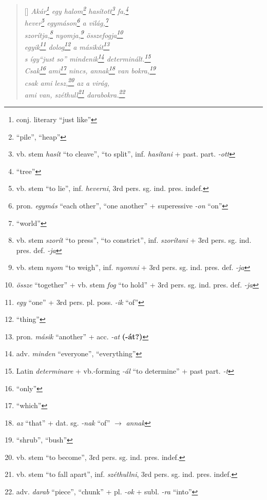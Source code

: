\documentclass[a4paper,12pt,twoside,final]{book}
\begin{document}
\begin{verse}[\versewidth]
  \it
  Akár\footnote{conj. literary ``just like''} egy
  halom\footnote{``pile'', ``heap''} hasított\footnote{vb. stem
  \emph{hasít} ``to cleave'', ``to split'', inf. \emph{hasítani} +
  past. part. \emph{-ott} } fa,\footnote{``tree''} \\
  hever\footnote{vb. stem ``to lie'', inf. \emph{heverni}, 3rd
    pers. sg. ind. pres. indef.} egymáson\footnote{pron. \emph{egymás}
  ``each other'', ``one another'' + superessive \emph{-on} ``on''} a
  világ,\footnote{``world''} \\
  szorítja,\footnote{vb. stem \emph{szorít} ``to press'', ``to
  constrict'', inf. \emph{szorítani} + 3rd
  pers. sg. ind. pres. def. \emph{-ja}} nyomja,\footnote{vb. stem \emph{nyom} ``to
  weigh'', inf. \emph{nyomni} + 3rd pers. sg. ind. pres. def. \emph{-ja}}
  összefogja\footnote{\emph{össze} ``together'' + vb. stem \emph{fog}
  ``to hold'' + 3rd pers. sg. ind. pres. def. \emph{-ja}} \\
  egyik\footnote{\emph{egy} ``one'' + 3rd
  pers. pl. poss. \emph{-ik} ``of'' } dolog\footnote{``thing''} a
  másikát\footnote{pron. \emph{másik} ``another'' +
  acc. \emph{-at} \textbf{(-át?)}} \\
  s így\emph{``just so''} mindenik\footnote{adv. \emph{minden}
  ``everyone'', ``everything''} determinált.\footnote{Latin \emph{determinare} +
  vb.-forming \emph{-ál} ``to determine'' + past part. \emph{-t}} \\
  Csak\footnote{``only''} ami\footnote{``which''} nincs,
  annak\footnote{\emph{az} ``that'' + dat. sg. \emph{-nak} ``of''
  $\rightarrow$ \emph{annak}}
  van bokra,\footnote{``shrub'', ``bush''} \\
  csak ami lesz,\footnote{vb. stem ``to become'', 3rd
  pers. sg. ind. pres. indef.} az a virág, \\
  ami van, széthull\footnote{vb. stem ``to fall apart'',
  inf. \emph{széthullni}, 3rd pers. sg. ind. pres. indef.}
  darabokra.\footnote{adv. \emph{darab} ``piece'', ``chunk'' +
  pl. \emph{-ok} + subl. \emph{-ra} ``into''}
\end{verse}


\newpage

\end{document}
